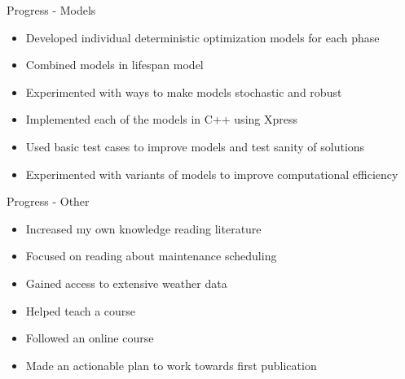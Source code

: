 \documentclass{beamer}
\begin{document}
\begin{frame}{Progress - Models}
\begin{itemize}
\item Developed individual deterministic optimization models for each phase
\item Combined models in lifespan model
\item Experimented with ways to make models stochastic and robust
\end{itemize}

\bigskip

\begin{itemize}
\item Implemented each of the models in C++ using Xpress
\item Used basic test cases to improve models and test sanity of solutions
\item Experimented with variants of models to improve computational efficiency
\end{itemize}
\end{frame}


\begin{frame}{Progress - Other}
\begin{itemize}
\item Increased my own knowledge reading literature
\item Focused on reading about maintenance scheduling
\item Gained access to extensive weather data
\item Helped teach a course
\item Followed an online course
\item Made an actionable plan to work towards first publication
\end{itemize}
\end{frame}
\end{document}
